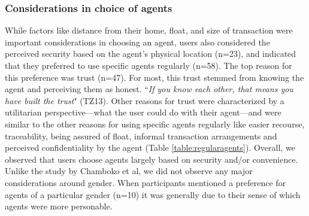 \subsubsection{Considerations in choice of agents}
While factors like distance from their home, float, and size of transaction were important considerations in choosing an agent, users also considered the perceived security based on the agent's physical location (n=23), and indicated that they preferred to use specific agents regularly (n=58). The top reason for this preference was trust (n=47).  For most, this trust stemmed from knowing the agent and perceiving them as honest. 
``\textit{If you know each other, that means you have built the trust}" (TZ13). 
Other reasons for trust were characterized by a utilitarian perspective---what the user could do with their agent---and were similar to the other reasons for using specific agents regularly like easier recourse, traceability, being assured of float, informal transaction arrangements and perceived confidentiality by the agent (Table \ref{table:regularagents}).
Overall, we observed that users choose agents largely based on security and/or convenience. Unlike the study by Chamboko et al, \cite{chamboko2021role} we did not observe any major considerations around gender. When participants mentioned a preference for agents of a particular gender (n=10) it was generally due to their sense of which agents were more personable.

